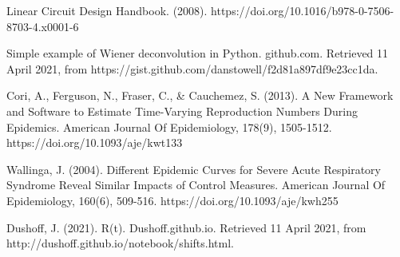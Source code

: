 \documentclass{article}
\begin{document}
\begin{thebibliography}{2}
Linear Circuit Design Handbook. (2008). https://doi.org/10.1016/b978-0-7506-8703-4.x0001-6

Simple example of Wiener deconvolution in Python. github.com. Retrieved 11 April 2021, from https://gist.github.com/danstowell/f2d81a897df9e23cc1da.

Cori, A., Ferguson, N., Fraser, C., \& Cauchemez, S. (2013). A New Framework and Software to Estimate Time-Varying Reproduction Numbers During Epidemics. American Journal Of Epidemiology, 178(9), 1505-1512. https://doi.org/10.1093/aje/kwt133

Wallinga, J. (2004). Different Epidemic Curves for Severe Acute Respiratory Syndrome Reveal Similar Impacts of Control Measures. American Journal Of Epidemiology, 160(6), 509-516. https://doi.org/10.1093/aje/kwh255

Dushoff, J. (2021). R(t). Dushoff.github.io. Retrieved 11 April 2021, from http://dushoff.github.io/notebook/shifts.html.

\end{thebibliography}
\end{document}

